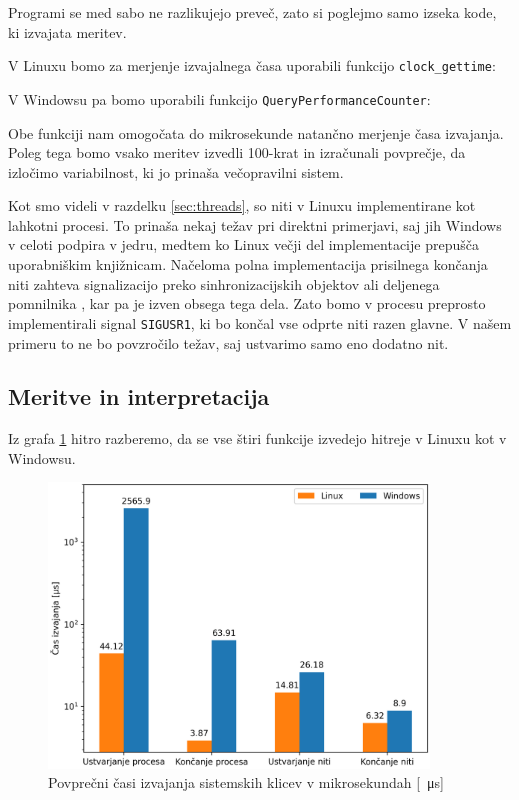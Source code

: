 \documentclass[a4paper,12pt,openright]{book}
\begin{document}
Programi se med sabo ne razlikujejo preveč, zato si poglejmo samo izseka kode, ki izvajata meritev.

V Linuxu bomo za merjenje izvajalnega časa uporabili funkcijo \texttt{clock\_gettime}:


V Windowsu pa bomo uporabili funkcijo \texttt{QueryPerformanceCounter}:


Obe funkciji nam omogočata do mikrosekunde natančno merjenje časa izvajanja.
Poleg tega bomo vsako meritev izvedli 100-krat in izračunali povprečje, da izločimo variabilnost, ki jo prinaša večopravilni sistem.

Kot smo videli v razdelku \ref{sec:threads}, so niti v Linuxu implementirane kot lahkotni procesi.
To prinaša nekaj težav pri direktni primerjavi, saj jih Windows v celoti podpira v jedru, medtem ko Linux večji del implementacije prepušča uporabniškim knjižnicam.
Načeloma polna implementacija prisilnega končanja niti zahteva signalizacijo preko sinhronizacijskih objektov ali deljenega pomnilnika \cite{Mueller_1993}, kar pa je izven obsega tega dela.
Zato bomo v procesu preprosto implementirali signal \texttt{SIGUSR1}, ki bo končal vse odprte niti razen glavne.
V našem primeru to ne bo povzročilo težav, saj ustvarimo samo eno dodatno nit.

\subsection{Meritve in interpretacija}

Iz grafa \ref{fig:syscall_comparison:times} hitro razberemo, da se vse štiri funkcije izvedejo hitreje v Linuxu kot v Windowsu.

\begin{figure}[h!]
	\begin{center}
		\includegraphics[width=0.9\textwidth]{images/syscall_comparison.png}
	\end{center}
	\caption{Povprečni časi izvajanja sistemskih klicev v mikrosekundah [\SI{}{\micro\second}]}
	\label{fig:syscall_comparison:times}
\end{figure}
\end{document}
